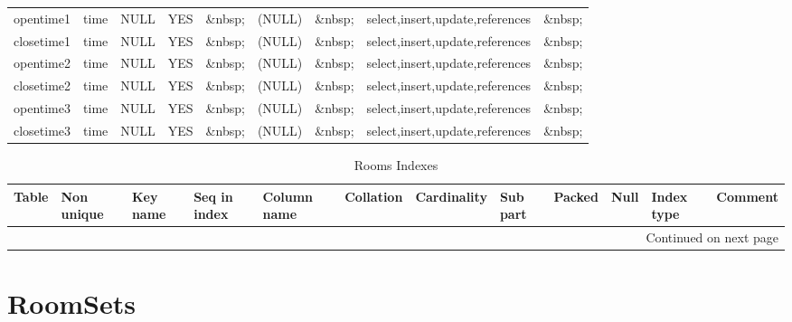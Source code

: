 \documentclass[tablesignature]{scrartcl}
\begin{document}
\begin{longtable}{|l|l|l|l|l|l|l|l|l|}
 opentime1         &  time          &  NULL                     &  YES      &  \&nbsp;  &  (NULL)   &  \&nbsp;            &  select,insert,update,references  &  \&nbsp;  \\
 closetime1        &  time          &  NULL                     &  YES      &  \&nbsp;  &  (NULL)   &  \&nbsp;            &  select,insert,update,references  &  \&nbsp;  \\
 opentime2         &  time          &  NULL                     &  YES      &  \&nbsp;  &  (NULL)   &  \&nbsp;            &  select,insert,update,references  &  \&nbsp;  \\
 closetime2        &  time          &  NULL                     &  YES      &  \&nbsp;  &  (NULL)   &  \&nbsp;            &  select,insert,update,references  &  \&nbsp;  \\
 opentime3         &  time          &  NULL                     &  YES      &  \&nbsp;  &  (NULL)   &  \&nbsp;            &  select,insert,update,references  &  \&nbsp;  \\
 closetime3        &  time          &  NULL                     &  YES      &  \&nbsp;  &  (NULL)   &  \&nbsp;            &  select,insert,update,references  &  \&nbsp;  \\
\hline
\end{longtable}


\begin{longtable}{|l|l|l|l|l|l|l|l|l|l|l|l|}
\caption{Rooms Indexes} \label{tbl:roomsindexes}\\
\hline
 Table  &  Non unique  &  Key name  &  Seq in index  &  Column name  &  Collation  &  Cardinality  &  Sub part  &  Packed  &  Null     &  Index type  &  Comment \\
\hline
\endhead
\hline\multicolumn{12}{r}{Continued on next page}\
\endfoot
\endlastfoot
\hline
 Rooms  &           0  &  PRIMARY   &             1  &  roomid       &  A          &           38  &  (NULL)    &  (NULL)  &  \&nbsp;  &  BTREE       &  \&nbsp;  \\
\hline
\end{longtable}
\section{RoomSets}
\label{sec-23}
\end{document}
